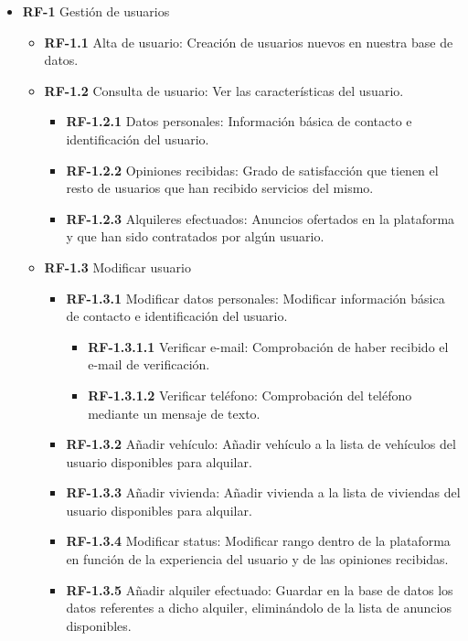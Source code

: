 \documentclass[11pt,spanish]{article} %
\begin{document}
\begin{itemize}
	\item \textbf{RF-1} Gestión de usuarios
	\begin{itemize}
		\item \textbf{RF-1.1} Alta de usuario: 
		Creación de usuarios nuevos en nuestra base de datos.

		\item \textbf{RF-1.2} Consulta de usuario: Ver las características del usuario.
		\begin{itemize}
			\item \textbf{RF-1.2.1} Datos personales: Información básica de contacto e identificación del usuario.
			\item \textbf{RF-1.2.2} Opiniones recibidas: Grado de satisfacción que tienen el resto de usuarios que han recibido servicios del mismo.
			\item \textbf{RF-1.2.3} Alquileres efectuados: Anuncios ofertados en la plataforma y que han sido contratados por algún usuario.
		\end{itemize}
		\item \textbf{RF-1.3} Modificar usuario
		\begin{itemize}
			\item \textbf{RF-1.3.1} Modificar datos personales: Modificar información básica de contacto e identificación del usuario.
			\begin{itemize}
				\item \textbf{RF-1.3.1.1} Verificar e-mail: Comprobación de haber recibido el e-mail de verificación.
				\item \textbf{RF-1.3.1.2} Verificar teléfono: Comprobación del teléfono mediante un mensaje de texto.
			\end{itemize}
			\item \textbf{RF-1.3.2} Añadir vehículo: Añadir vehículo a la lista de vehículos del usuario disponibles para alquilar.
			\item \textbf{RF-1.3.3} Añadir vivienda: Añadir vivienda a la lista de viviendas del usuario disponibles para alquilar.
			\item \textbf{RF-1.3.4} Modificar status: Modificar rango dentro de la plataforma en función de la experiencia del usuario y de las opiniones recibidas.
			\item \textbf{RF-1.3.5} Añadir alquiler efectuado: Guardar en la base de datos los datos referentes a dicho alquiler, eliminándolo de la lista de anuncios disponibles.
		\end{itemize}

\end{itemize}
\end{itemize}
\end{document}
